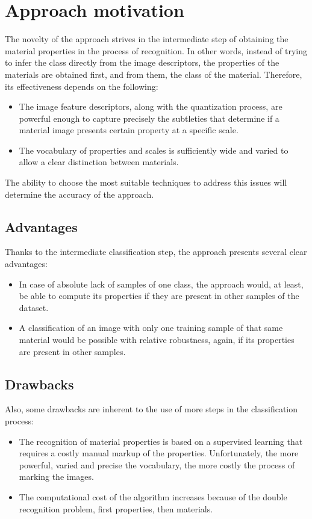 
\section{Approach motivation} \label{sec:approach}

The novelty of the approach strives in the intermediate step of obtaining the material properties in the process of recognition. In other words, instead of trying to infer the class directly from the image descriptors, the properties of the materials are obtained first, and from them, the class of the material. Therefore, its effectiveness depends on the following:

\begin{itemize}
    \item The image feature descriptors, along with the quantization process, are powerful enough to capture precisely the subtleties that determine if a material image presents certain property at a specific scale.
    \item The vocabulary of properties and scales is sufficiently wide and varied to allow a clear distinction between materials. 
\end{itemize}

The ability to choose the most suitable techniques to address this issues will determine the accuracy of the approach.

\subsection{Advantages}

Thanks to the intermediate classification step, the approach presents several clear advantages:

\begin{itemize} 
    \item In case of absolute lack of samples of one class, the approach would, at least, be able to compute its properties if they are present in other samples of the dataset.
    \item A classification of an image with only one training sample of that same material would be possible with relative robustness, again, if its properties are present in other samples.
\end{itemize}   

\subsection{Drawbacks}

Also, some drawbacks are inherent to the use of more steps in the classification process:

\begin{itemize}
    \item The recognition of material properties is based on a supervised learning that requires a costly manual markup of the properties. Unfortunately, the more powerful, varied and precise the vocabulary, the more costly the process of marking the images.
    \item The computational cost of the algorithm increases because of the double recognition problem, first properties, then materials.
\end{itemize}
